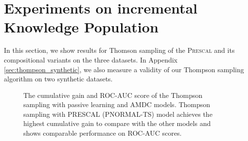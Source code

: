 
\section{Experiments on incremental\\ Knowledge Population}
\label{sec:exp2}

In this section, we show results for Thomson sampling of the \textsc{Prescal} and its compositional variants on the three datasets. In Appendix \ref{sec:thompson_synthetic}, we also measure a validity of our Thompson sampling algorithm on two synthetic datasets.

\begin{figure}[t]
	\centering

	\caption{\label{fig:vs_greedy} The cumulative gain and ROC-AUC score of the Thompson sampling with passive learning and  AMDC models. Thompson sampling with PRESCAL (\textsc{PNORMAL-TS}) model achieves the highest cumulative gain to compare with the other models and shows comparable performance on ROC-AUC scores.}
\end{figure}

